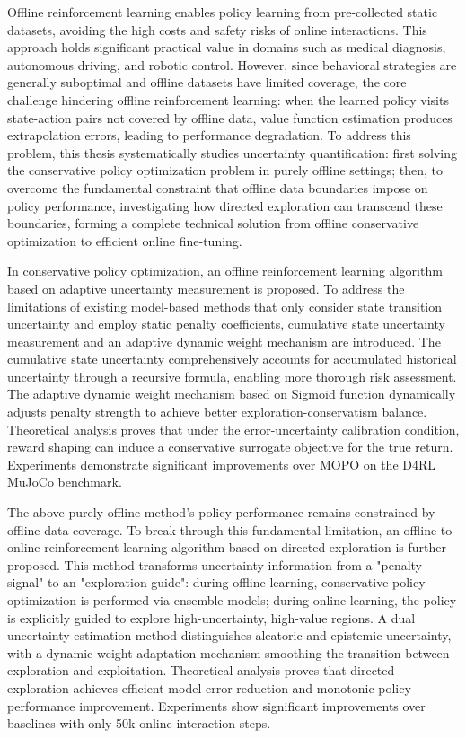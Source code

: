 \begin{englishabstract}

  Offline reinforcement learning enables policy learning from pre-collected static datasets, avoiding the high costs and safety risks of online interactions. This approach holds significant practical value in domains such as medical diagnosis, autonomous driving, and robotic control. However, since behavioral strategies are generally suboptimal and offline datasets have limited coverage, the core challenge hindering offline reinforcement learning: when the learned policy visits state-action pairs not covered by offline data, value function estimation produces extrapolation errors, leading to performance degradation. To address this problem, this thesis systematically studies uncertainty quantification: first solving the conservative policy optimization problem in purely offline settings; then, to overcome the fundamental constraint that offline data boundaries impose on policy performance, investigating how directed exploration can transcend these boundaries, forming a complete technical solution from offline conservative optimization to efficient online fine-tuning.

  In conservative policy optimization, an offline reinforcement learning algorithm based on adaptive uncertainty measurement is proposed. To address the limitations of existing model-based methods that only consider state transition uncertainty and employ static penalty coefficients, cumulative state uncertainty measurement and an adaptive dynamic weight mechanism are introduced. The cumulative state uncertainty comprehensively accounts for accumulated historical uncertainty through a recursive formula, enabling more thorough risk assessment. The adaptive dynamic weight mechanism based on Sigmoid function dynamically adjusts penalty strength to achieve better exploration-conservatism balance. Theoretical analysis proves that under the error-uncertainty calibration condition, reward shaping can induce a conservative surrogate objective for the true return. Experiments demonstrate significant improvements over MOPO on the D4RL MuJoCo benchmark.

  The above purely offline method's policy performance remains constrained by offline data coverage. To break through this fundamental limitation, an offline-to-online reinforcement learning algorithm based on directed exploration is further proposed. This method transforms uncertainty information from a "penalty signal" to an "exploration guide": during offline learning, conservative policy optimization is performed via ensemble models; during online learning, the policy is explicitly guided to explore high-uncertainty, high-value regions. A dual uncertainty estimation method distinguishes aleatoric and epistemic uncertainty, with a dynamic weight adaptation mechanism smoothing the transition between exploration and exploitation. Theoretical analysis proves that directed exploration achieves efficient model error reduction and monotonic policy performance improvement. Experiments show significant improvements over baselines with only 50k online interaction steps.


\end{englishabstract}
